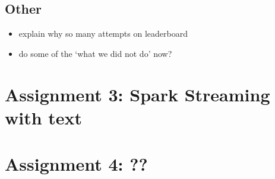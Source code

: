\documentclass[a4paper,11pt]{article}
\begin{document}
\subsection{Other}
\begin{itemize}
\item explain why so many attempts on leaderboard
\item do some of the `what we did not do' now?
\end{itemize}


\pagebreak
\section{Assignment 3: Spark Streaming with text}



\pagebreak
\section{Assignment 4: ??}
\end{document}
